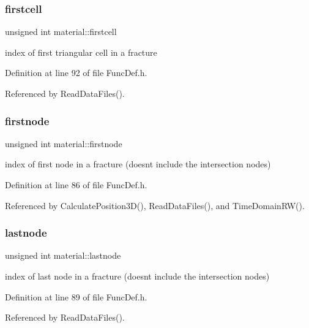 \subsubsection{\texorpdfstring{firstcell}{firstcell}}
{\footnotesize\ttfamily unsigned int material\+::firstcell}

index of first triangular cell in a fracture 

Definition at line 92 of file Func\+Def.\+h.



Referenced by Read\+Data\+Files().

\mbox{\label{structmaterial_a82946cb78555ad8c4c14a12fbd7aa3f8}} 
\subsubsection{\texorpdfstring{firstnode}{firstnode}}
{\footnotesize\ttfamily unsigned int material\+::firstnode}

index of first node in a fracture (doesn\textquotesingle{}t include the intersection nodes) 

Definition at line 86 of file Func\+Def.\+h.



Referenced by Calculate\+Position3\+D(), Read\+Data\+Files(), and Time\+Domain\+R\+W().

\mbox{\label{structmaterial_a9bbfaca53483df79578f4ae037867851}} 
\subsubsection{\texorpdfstring{lastnode}{lastnode}}
{\footnotesize\ttfamily unsigned int material\+::lastnode}

index of last node in a fracture (doesn\textquotesingle{}t include the intersection nodes) 

Definition at line 89 of file Func\+Def.\+h.



Referenced by Read\+Data\+Files().

\mbox{\label{structmaterial_a84365556a52eb9959d6d869dda76433c}} 
